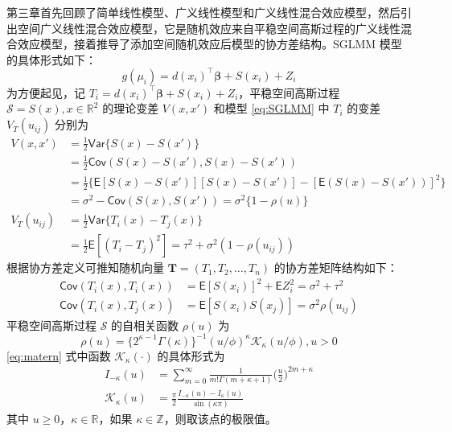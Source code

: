 \documentclass[12pt,a4paper,UTF8,twoside]{book}
\begin{document}
第三章首先回顾了简单线性模型、广义线性模型和广义线性混合效应模型，然后引出空间广义线性混合效应模型，它是随机效应来自平稳空间高斯过程的广义线性混合效应模型，接着推导了添加空间随机效应后模型的协方差结构。SGLMM
模型的具体形式如下： \begin{equation}
g(\mu_i) = d(x_i)^{\top}\boldsymbol{\beta} + S(x_i) + Z_i \label{eq:SGLMM}
\end{equation} \noindent 为方便起见，记
\(T_{i} = d(x_i)^{\top}\boldsymbol{\beta} + S(x_i) + Z_i\)，平稳空间高斯过程
\(\mathcal{S} = S(x), x \in \mathbb{R}^2\) 的理论变差 \(V(x,x')\) 和模型
\eqref{eq:SGLMM} 中 \(T_{i}\) 的变差 \(V_{T}(u_{ij})\) 分别为
\begin{equation}
\begin{aligned}
V(x,x') 
      &= \frac{1}{2}\mathsf{Var}\{S(x)-S(x')\} \\
      &= \frac{1}{2}\mathsf{Cov}(S(x)-S(x'),S(x)-S(x'))\\
      &= \frac{1}{2}\{\mathsf{E}[S(x)-S(x')][S(x)-S(x')]-[\mathsf{E}(S(x)-S(x'))]^2\}\\
      &= \sigma^2-\mathsf{Cov}(S(x),S(x'))=\sigma^2\{1-\rho(u)\}\\
V_{T}(u_{ij})
      &= \frac{1}{2}\mathsf{Var}\{T_{i}(x)-T_{j}(x)\} \\
      &= \frac{1}{2}\mathsf{E}[(T_{i}-T_{j})^2]=\tau^2+\sigma^2(1-\rho(u_{ij})) 
\end{aligned} \label{eq:variograms}
\end{equation} \noindent 根据协方差定义可推知随机向量
\(\mathbf{T} = (T_1,T_2,\ldots,T_n)\) 的协方差矩阵结构如下：
\begin{equation}
\begin{aligned}
\mathsf{Cov}(T_{i}(x),T_{i}(x)) &= \mathsf{E}[S(x_i)]^2 + \mathsf{E}Z_{i}^{2}= \sigma^2+\tau^2 \\
\mathsf{Cov}(T_{i}(x),T_{j}(x)) &= \mathsf{E}[S(x_i)S(x_j)]  = \sigma^2\rho(u_{ij})
\end{aligned}
\end{equation} \noindent 平稳空间高斯过程 \(\mathcal{S}\) 的自相关函数
\(\rho(u)\) 为 \begin{equation}
\rho(u)=\{2^{\kappa -1}\Gamma(\kappa)\}^{-1}(u/\phi)^{\kappa}\mathcal{K}_{\kappa}(u/\phi),u > 0 \label{eq:matern}
\end{equation} \noindent \eqref{eq:matern} 式中函数
\(\mathcal{K}_{\kappa}(\cdot)\) 的具体形式为 \begin{equation}
\begin{aligned}
I_{-\kappa}(u) & =  \sum_{m=0}^{\infty} \frac{1}{m!\Gamma(m + \kappa + 1)} \big(\frac{u}{2}\big)^{2m + \kappa} \\
\mathcal{K}_{\kappa}(u) & = \frac{\pi}{2} \frac{I_{-\kappa}(u) - I_{\kappa}(u)}{\sin (\kappa \pi)}
\end{aligned} \label{eq:besselK-function}
\end{equation} \noindent 其中
\(u \geq 0\)，\(\kappa \in \mathbb{R}\)，如果
\(\kappa \in \mathbb{Z}\)，则取该点的极限值。
\end{document}
